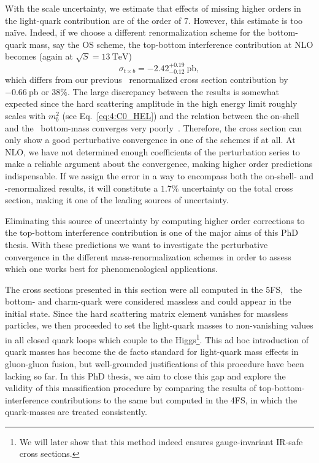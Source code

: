 With the scale uncertainty, we estimate that effects of missing higher orders in the light-quark contribution are of the order of $7$\textperthousand. However, this estimate is too na\"ive. Indeed, if we choose a different renormalization scheme for the bottom-quark mass, say the \acs{OS} scheme, the top-bottom interference contribution at \acs{NLO} becomes (again at $\sqrt{S} = 13\ \mathrm{TeV}$)
\begin{equation}
\sigma_{t \times b} = -2.42^{+0.19}_{-0.12}\ \mathrm{pb},
\end{equation}
which differs from our previous \MS\ renormalized cross section contribution by $-0.66\ \mathrm{pb}$ or $38\%$. The large discrepancy between the results is somewhat expected since the hard scattering amplitude in the high energy limit roughly scales with $m_b^2$ (see Eq.~\eqref{eq:4:C0_HEL}) and the relation between the on-shell and the \MS\ bottom-mass converges very poorly~\cite{Marquard:2015qpa, Marquard:2016vmy}. Therefore, the cross section can only show a good perturbative convergence in one of the schemes if at all. At \acs{NLO}, we have not determined enough coefficients of the perturbation series to make a reliable argument about the convergence, making higher order predictions indispensable. If we assign the error in a way to encompass both the on-shell- and \MS-renormalized results, it will constitute a $1.7\%$ uncertainty on the total cross section, making it one of the leading sources of uncertainty.

Eliminating this source of uncertainty by computing higher order corrections to the top-bottom interference contribution is one of the major aims of this PhD thesis. With these predictions we want to investigate the perturbative convergence in the different mass-renormalization schemes in order to assess which one works best for phenomenological applications.

The cross sections presented in this section were all computed in the 5\acs{FS}, \ie\ the bottom- and charm-quark were considered massless and could appear in the initial state. Since the hard scattering matrix element vanishes for massless particles, we then proceeded to set the light-quark masses to non-vanishing values in all closed quark loops which couple to the Higgs\footnote{We will later show that this method indeed ensures gauge-invariant \acs{IR}-safe cross sections.}. This ad hoc introduction of quark masses has become the de facto standard for light-quark mass effects in gluon-gluon fusion, but well-grounded justifications of this procedure have been lacking so far. In this PhD thesis, we aim to close this gap and explore the validity of this massification procedure by comparing the results of top-bottom-interference contributions to the same but computed in the 4\acs{FS}, in which the quark-masses are treated consistently.

